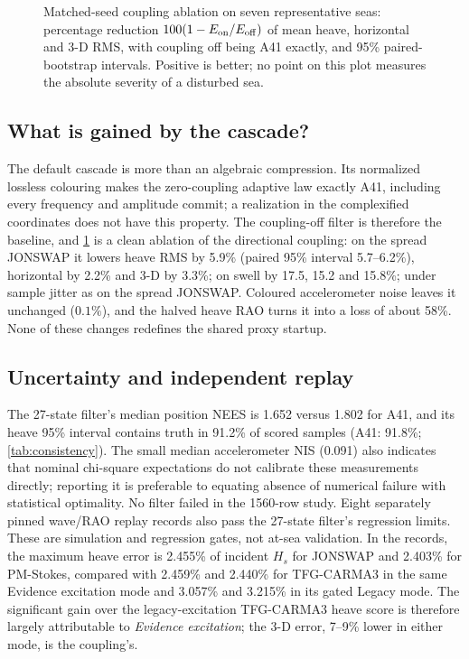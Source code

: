 \documentclass[conference]{IEEEtran}
\newcommand{\InputPart}[1]{}
\begin{document}
\begin{figure}[!t]
\centering

\caption{Matched-seed coupling ablation on seven representative seas:
percentage reduction $100(1-E_{\rm on}/E_{\rm off})$ of mean heave,
horizontal and 3-D RMS, with coupling off being A41 exactly, and 95\%
paired-bootstrap intervals. Positive is better; no point on this plot
measures the absolute severity of a disturbed sea.}
\label{fig:ablation}
\end{figure}

\subsection{What is gained by the cascade?}
The default cascade is more than an algebraic compression. Its normalized
lossless colouring makes the zero-coupling adaptive law exactly A41,
including every frequency and amplitude commit; a realization in the
complexified coordinates does not have this property. The coupling-off
filter is therefore the baseline, and \cref{fig:ablation} is a clean
ablation of the directional coupling: on the spread JONSWAP it lowers heave
RMS by 5.9\% (paired 95\% interval 5.7--6.2\%), horizontal by 2.2\% and
3-D by 3.3\%; on swell by 17.5, 15.2 and 15.8\%; under sample jitter as on
the spread JONSWAP. Coloured accelerometer noise leaves it unchanged
($0.1\%$), and the halved heave RAO turns it into a loss of about 58\%.
None of these changes redefines the shared proxy startup.

\subsection{Uncertainty and independent replay}
\begin{table}[!t]
\caption{Pooled consistency diagnostics over 26 seas and 30 seeds. Values
are medians of per-run time-averaged NEES and NIS, mean empirical heave
95\% interval coverage, and number of failed runs.}
\label{tab:consistency}
\centering\footnotesize
\resizebox{\columnwidth}{!}{\InputPart{csm-consistency.tex-part}}
\end{table}

The 27-state filter's median position NEES is 1.652 versus 1.802 for A41,
and its heave 95\% interval contains truth in 91.2\% of scored samples
(A41: 91.8\%; \cref{tab:consistency}). The small median accelerometer NIS (0.091)
also indicates that nominal chi-square expectations do not calibrate these
measurements directly; reporting it is preferable to equating absence of
numerical failure with statistical optimality. No filter failed in the
1560-row study. Eight separately pinned wave/RAO replay records also pass
the 27-state filter's regression limits. These are simulation and regression
gates, not at-sea validation. In the records, the maximum heave error is
2.455\% of incident $H_s$ for JONSWAP and 2.403\% for PM-Stokes, compared
with 2.459\% and 2.440\% for TFG-CARMA3 in the same Evidence excitation mode
and 3.057\% and 3.215\% in its gated Legacy mode. The significant gain over
the legacy-excitation TFG-CARMA3 heave score is therefore largely
attributable to \emph{Evidence excitation}; the 3-D error, 7--9\% lower in
either mode, is the coupling's.
\end{document}
